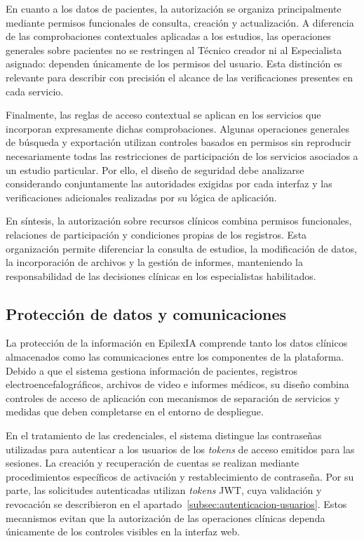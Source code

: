 En cuanto a los datos de pacientes, la autorización se organiza principalmente mediante permisos funcionales de consulta, creación y actualización. A diferencia de las comprobaciones contextuales aplicadas a los estudios, las operaciones generales sobre pacientes no se restringen al Técnico creador ni al Especialista asignado: dependen únicamente de los permisos del usuario. Esta distinción es relevante para describir con precisión el alcance de las verificaciones presentes en cada servicio.

Finalmente, las reglas de acceso contextual se aplican en los servicios que incorporan expresamente dichas comprobaciones. Algunas operaciones generales de búsqueda y exportación utilizan controles basados en permisos sin reproducir necesariamente todas las restricciones de participación de los servicios asociados a un estudio particular. Por ello, el diseño de seguridad debe analizarse considerando conjuntamente las autoridades exigidas por cada interfaz y las verificaciones adicionales realizadas por su lógica de aplicación.

En síntesis, la autorización sobre recursos clínicos combina permisos funcionales, relaciones de participación y condiciones propias de los registros. Esta organización permite diferenciar la consulta de estudios, la modificación de datos, la incorporación de archivos y la gestión de informes, manteniendo la responsabilidad de las decisiones clínicas en los especialistas habilitados.


\subsection{Protección de datos y comunicaciones}
\label{subsec:proteccion-datos-comunicaciones}

La protección de la información en EpilexIA comprende tanto los datos clínicos almacenados como las comunicaciones entre los componentes de la plataforma. Debido a que el sistema gestiona información de pacientes, registros electroencefalográficos, archivos de video e informes médicos, su diseño combina controles de acceso de aplicación con mecanismos de separación de servicios y medidas que deben completarse en el entorno de despliegue.

En el tratamiento de las credenciales, el sistema distingue las contraseñas utilizadas para autenticar a los usuarios de los \textit{tokens} de acceso emitidos para las sesiones. La creación y recuperación de cuentas se realizan mediante procedimientos específicos de activación y restablecimiento de contraseña. Por su parte, las solicitudes autenticadas utilizan \textit{tokens} JWT, cuya validación y revocación se describieron en el apartado~\ref{subsec:autenticacion-usuarios}. Estos mecanismos evitan que la autorización de las operaciones clínicas dependa únicamente de los controles visibles en la interfaz web.

